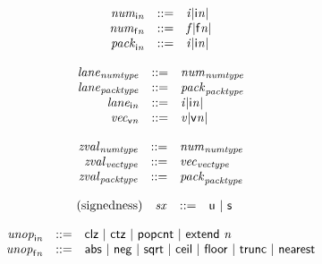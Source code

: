 \vspace{1ex}

\vspace{1ex}

\vspace{1ex}

$$
\begin{array}{@{}lrrl@{}l@{}}
& {{\mathit{num}}}_{{\mathsf{i}}{{\mathit{n}}}} &::=& {{\mathit{i}}}{{|{\mathsf{i}}{{\mathit{n}}}|}} \\
& {{\mathit{num}}}_{{\mathsf{f}}{{\mathit{n}}}} &::=& {{\mathit{f}}}{{|{\mathsf{f}}{{\mathit{n}}}|}} \\
& {{\mathit{pack}}}_{{\mathsf{i}}{{\mathit{n}}}} &::=& {{\mathit{i}}}{{|{\mathsf{i}}{{\mathit{n}}}|}} \\
\end{array}
$$

$$
\begin{array}{@{}lrrl@{}l@{}}
& {{\mathit{lane}}}_{{\mathit{numtype}}} &::=& {{\mathit{num}}}_{{\mathit{numtype}}} \\
& {{\mathit{lane}}}_{{\mathit{packtype}}} &::=& {{\mathit{pack}}}_{{\mathit{packtype}}} \\
& {{\mathit{lane}}}_{{\mathsf{i}}{{\mathit{n}}}} &::=& {{\mathit{i}}}{{|{\mathsf{i}}{{\mathit{n}}}|}} \\
& {{\mathit{vec}}}_{{\mathsf{v}}{{\mathit{n}}}} &::=& {{\mathit{v}}}{{|{\mathsf{v}}{{\mathit{n}}}|}} \\
\end{array}
$$

$$
\begin{array}{@{}lrrl@{}l@{}}
& {{\mathit{zval}}}_{{\mathit{numtype}}} &::=& {{\mathit{num}}}_{{\mathit{numtype}}} \\
& {{\mathit{zval}}}_{{\mathit{vectype}}} &::=& {{\mathit{vec}}}_{{\mathit{vectype}}} \\
& {{\mathit{zval}}}_{{\mathit{packtype}}} &::=& {{\mathit{pack}}}_{{\mathit{packtype}}} \\
\end{array}
$$

\vspace{1ex}

$$
\begin{array}{@{}lrrl@{}l@{}}
\mbox{(signedness)} & {\mathit{sx}} &::=& \mathsf{u} ~|~ \mathsf{s} \\
\end{array}
$$

$$
\begin{array}{@{}lrrl@{}l@{}}
& {{\mathit{unop}}}_{{\mathsf{i}}{{\mathit{n}}}} &::=& \mathsf{clz} ~|~ \mathsf{ctz} ~|~ \mathsf{popcnt} ~|~ \mathsf{extend}~{\mathit{n}} \\
& {{\mathit{unop}}}_{{\mathsf{f}}{{\mathit{n}}}} &::=& \mathsf{abs} ~|~ \mathsf{neg} ~|~ \mathsf{sqrt} ~|~ \mathsf{ceil} ~|~ \mathsf{floor} ~|~ \mathsf{trunc} ~|~ \mathsf{nearest} \\
\end{array}
$$

